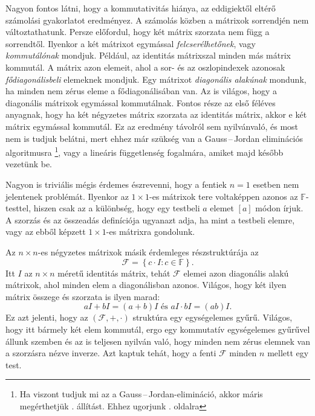 \documentclass[9pt, a4paper, showtrims]{memoir}
\theoremstyle{plain}
\theoremstyle{remark}
\theoremstyle{definition}
\begin{document}
Nagyon fontos látni, hogy a kommutativitás hiánya, az eddigiektől eltérő számolási gyakorlatot eredményez.
A számolás közben a mátrixok sorrendjén nem változtathatunk.
Persze előfordul, hogy két mátrix szorzata nem függ a sorrendtől.
Ilyenkor a két mátrixot egymással \emph{felcserélhetőnek}, vagy \emph{kommutálónak} mondjuk.
Például, az identitás mátrixszal minden más mátrix kommutál.
A mátrix azon elemeit, ahol a sor- és az oszlopindexek azonosak
\emph{fődiagonálisbeli}
elemeknek mondjuk.
Egy mátrixot
\emph{diagonális alakúnak}
mondunk,
ha minden nem zérus eleme a fődiagonálisában van.
Az is világos, hogy a diagonális mátrixok egymással kommutálnak.
Fontos része az első féléves anyagnak, hogy ha két négyzetes mátrix szorzata az identitás mátrix,
akkor e két mátrix egymással kommutál.
Ez az eredmény távolról sem nyilvánvaló, és most nem is tudjuk belátni, mert ehhez már szükség van a Gauss\,--\,Jordan eliminációs algoritmusra
\footnote{Ha viszont tudjuk mi az a Gauss\,--\,Jordan-elimináció, akkor máris megérthetjük . állítást. Ehhez ugorjunk . oldalra}, vagy a lineáris függetlenség fogalmára, 
amiket majd később vezetünk be.\label{pg:kommutal}

Nagyon is triviális mégis érdemes észrevenni, hogy a fentiek $n=1$ esetben nem jelentenek problémát.
Ilyenkor az $1\times 1$-es mátrixok tere voltaképpen azonos az $\mathbb{F}$-testtel, hiszen csak az a különbség,
hogy egy testbeli $a$ elemet $[a]$ módon írjuk. A szorzás és az összeadás definíciója ugyanazt adja,
ha mint a testbeli elemre, vagy az ebből képzett $1\times 1$-es mátrixra gondolunk.

Az $n\times n$-es négyzetes mátrixok másik érdemleges részstruktúrája az
\[
	\mathcal{F}=
	\left\{ c\cdot I:c\in\mathbb{F} \right\}.
\]
Itt $I$ az $n\times n$ méretű identitás mátrix, tehát $\mathcal{F}$ elemei azon diagonális alakú mátrixok,
ahol minden elem a diagonálisban azonos.
Világos, hogy két ilyen mátrix összege és szorzata is ilyen marad:
\[
	aI+bI=\left( a+b \right)I\text{ és } aI\cdot bI=\left( ab \right)I.
\]
Ez azt jelenti, hogy az $\left( \mathcal{F},+,\cdot \right)$ struktúra egy egységelemes gyűrű.
Világos, hogy itt bármely két elem kommutál, ergo egy kommutatív egységelemes gyűrűvel állunk szemben és
az is teljesen nyilván való, hogy minden nem zérus elemnek van a szorzásra nézve inverze.
Azt kaptuk tehát, hogy a fenti $\mathcal{F}$ minden $n$ mellett egy test.
\end{document}
